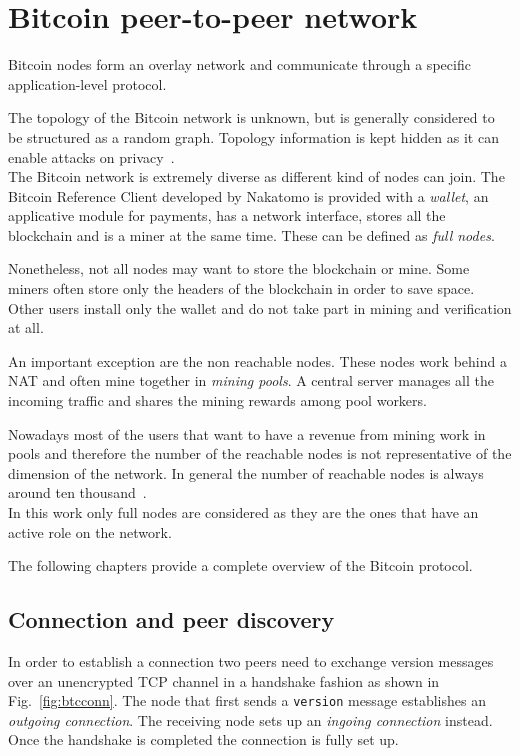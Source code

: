 \chapter{Bitcoin peer-to-peer network}
\label{sec:netintro}

Bitcoin nodes form an overlay network and communicate through a specific application-level protocol.

The topology of the Bitcoin network is unknown, but is generally considered to be structured as a random graph. Topology information is kept hidden as it can enable attacks on privacy~\cite{biryukov2014deanonymisation}.
~\cite{Deshpande2018BTCmapMB}\\

The Bitcoin network is extremely diverse as different kind of nodes can join. The Bitcoin Reference Client developed by Nakatomo is provided with a \textit{wallet}, an applicative module for payments, has a network interface, stores all the blockchain and is a miner at the same time. These can be defined as \textit{full nodes}.

Nonetheless, not all nodes may want to store the blockchain or mine. Some miners often store only the headers of the blockchain in order to save space. Other users install only the wallet and do not take part in mining and verification at all.

An important exception are the non reachable nodes. These nodes work behind a NAT and often mine together in \textit{mining pools}. A central server manages all the incoming traffic and shares the mining rewards among pool workers.

Nowadays most of the users that want to have a revenue from mining work in pools and therefore the number of the reachable nodes is not representative of the dimension of the network. In general the number of reachable nodes is always around ten thousand~\cite{totknownfullnodes}.\\ 

In this work only full nodes are considered as they are the ones that have an active role on the network.

The following chapters provide a complete overview of the Bitcoin protocol.

\section{Connection and peer discovery}\label{sec:peerdisc}
In order to establish a connection two peers need to exchange version messages over an unencrypted TCP channel in a handshake fashion as shown in Fig.~\ref{fig:btcconn}. The node that first sends a \texttt{version} message establishes an \emph{outgoing connection}. The receiving node sets up an \emph{ingoing connection} instead. Once the handshake is completed the connection is fully set up.

